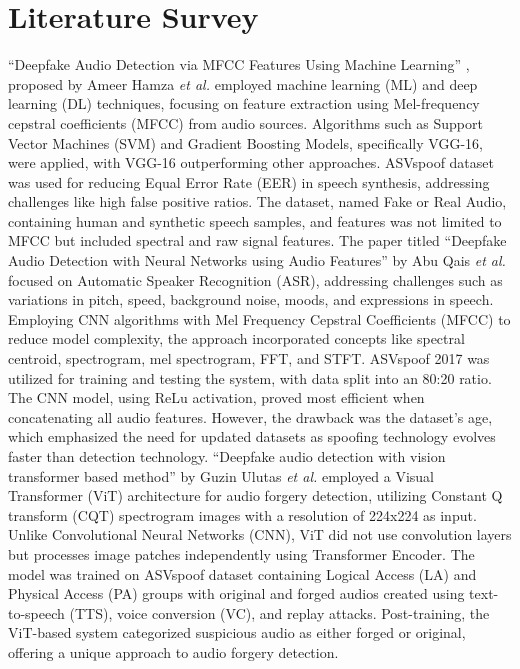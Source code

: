 \chapter{Literature Survey}

“Deepfake Audio Detection via MFCC Features Using Machine Learning” \cite{b1}, proposed by Ameer Hamza \textit{et al.} employed machine learning (ML) and deep learning (DL) techniques, focusing on feature extraction using Mel-frequency cepstral coefficients (MFCC) from audio sources. Algorithms such as Support Vector Machines (SVM) and Gradient Boosting Models, specifically VGG-16, were applied, with VGG-16 outperforming other approaches. ASVspoof dataset was used for reducing Equal Error Rate (EER) in speech synthesis, addressing challenges like high false positive ratios. 
The dataset, named Fake or Real Audio, containing human and synthetic speech samples, and features was not limited to MFCC but included spectral and raw signal features.\newline
\newline
The paper titled “Deepfake Audio Detection with Neural Networks using Audio Features” \cite{b2} by Abu Qais \textit{et al.} focused on Automatic Speaker Recognition (ASR), addressing challenges such as variations in pitch, speed, background noise, moods, and expressions in speech. Employing CNN algorithms with Mel Frequency Cepstral Coefficients (MFCC) to reduce model complexity, the approach incorporated concepts like spectral centroid, spectrogram, mel spectrogram, FFT, and STFT. ASVspoof 2017 was utilized for training and testing the system, with data split into an 80:20 ratio. The CNN model, using ReLu activation, proved most efficient when concatenating all audio features. However, the drawback was the dataset's age, which emphasized the need for updated datasets as spoofing technology evolves faster than detection technology.\newline
\newline
“Deepfake audio detection with vision transformer based method” \cite{b3} by Guzin Ulutas \textit{et al.} employed a Visual Transformer (ViT) architecture for audio forgery detection, utilizing Constant Q transform (CQT) spectrogram images with a resolution of 224x224 as input. Unlike Convolutional Neural Networks (CNN), ViT did not use convolution layers but processes image patches independently using Transformer Encoder. The model was trained on ASVspoof dataset containing Logical Access (LA) and Physical Access (PA) groups with original and forged audios created using text-to-speech (TTS), voice conversion (VC), and replay attacks. Post-training, the ViT-based system categorized suspicious audio as either forged or original, offering a unique approach to audio forgery detection.\newline
